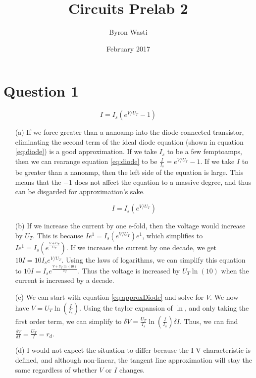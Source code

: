 \documentclass{article}
\title{Circuits Prelab 2}
\author{Byron Wasti}
\date{February 2017}
\begin{document}
\maketitle

\section{Question 1}

\begin{equation} \label{eq:diode}
    I = I_s(e^{V/U_T} - 1)
\end{equation}


\begin{itemize}

    \item [(a)] 
        If we force greater than a nanoamp into the diode-connected transistor, eliminating the second term of the ideal diode equation (shown in equation \ref{eq:diode}) is a good approximation. If we take $I_s$ to be a few femptoamps, then we can rearange equation \ref{eq:diode} to be $\frac{I}{I_s} = e^{V/U_T} - 1$. If we take $I$ to be greater than a nanoamp, then the left side of the equation is large. This means that the $-1$ does not affect the equation to a massive degree, and thus can be disgarded for approximation's sake.

\begin{equation} \label{eq:approxDiode}
    I = I_s(e^{V/U_T})
\end{equation}

    \item [(b)] 
        If we increase the current by one e-fold, then the voltage would increase by $U_T$. This is because $Ie^1 = I_s(e^{V/U_T})e^1$, which simplifies to $Ie^1 = I_s( e^{ \frac{V + U_T}{U_T}})$. If we increase the current by one decade, we get $10I = 10I_se^{V/U_T}$. Using the laws of logarithms, we can simplify this equation to $10I = I_se^{\frac{V+U_T\ln{(10)}}{U_T}}$. Thus the voltage is increased by $U_T\ln{(10)}$ when the current is increased by a decade.

    \item [(c)]
        We can start with equation \ref{eq:approxDiode} and solve for $V$. We now have $V = U_T\ln{(\frac{I}{I_s})}$. Using the taylor expansion of $\ln$, and only taking the first order term, we can simplify to $\delta V = \frac{U_T}{I_s}\ln{(\frac{I}{I_s})}\delta I$. Thus, we can find $\frac{ \delta V}{\delta I} = \frac{U_T}{I} = r_d$. 

    \item [(d)]
        I would not expect the situation to differ because the I-V characteristic is defined, and although non-linear, the tangent line approximation will stay the same regardless of whether $V$ or $I$ changes.
        

\end{itemize}
\end{document}
